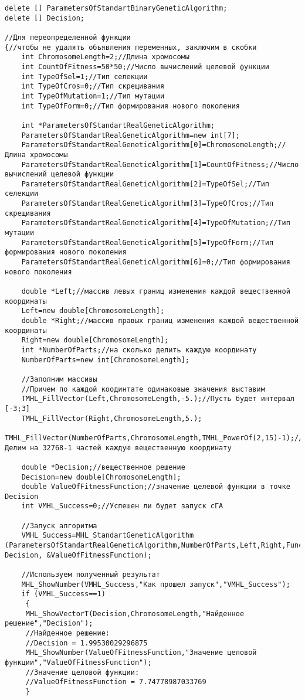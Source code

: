 \documentclass[a4paper,12pt]{article}
\begin{document}
\begin{lstlisting}[label=code_use_MHL_StandartGeneticAlgorithm,caption=Пример использования]
delete [] ParametersOfStandartBinaryGeneticAlgorithm;
delete [] Decision;

//Для переопределенной функции
{//чтобы не удалять объявления переменных, заключим в скобки
    int ChromosomeLength=2;//Длина хромосомы
    int CountOfFitness=50*50;//Число вычислений целевой функции
    int TypeOfSel=1;//Тип селекции
    int TypeOfCros=0;//Тип скрещивания
    int TypeOfMutation=1;//Тип мутации
    int TypeOfForm=0;//Тип формирования нового поколения

    int *ParametersOfStandartRealGeneticAlgorithm;
    ParametersOfStandartRealGeneticAlgorithm=new int[7];
    ParametersOfStandartRealGeneticAlgorithm[0]=ChromosomeLength;//Длина хромосомы
    ParametersOfStandartRealGeneticAlgorithm[1]=CountOfFitness;//Число вычислений целевой функции
    ParametersOfStandartRealGeneticAlgorithm[2]=TypeOfSel;//Тип селекции
    ParametersOfStandartRealGeneticAlgorithm[3]=TypeOfCros;//Тип скрещивания
    ParametersOfStandartRealGeneticAlgorithm[4]=TypeOfMutation;//Тип мутации
    ParametersOfStandartRealGeneticAlgorithm[5]=TypeOfForm;//Тип формирования нового поколения
    ParametersOfStandartRealGeneticAlgorithm[6]=0;//Тип формирования нового поколения

    double *Left;//массив левых границ изменения каждой вещественной координаты
    Left=new double[ChromosomeLength];
    double *Right;//массив правых границ изменения каждой вещественной координаты
    Right=new double[ChromosomeLength];
    int *NumberOfParts;//на сколько делить каждую координату
    NumberOfParts=new int[ChromosomeLength];

    //Заполним массивы
    //Причем по каждой коодинтате одинаковые значения выставим
    TMHL_FillVector(Left,ChromosomeLength,-5.);//Пусть будет интервал [-3;3]
    TMHL_FillVector(Right,ChromosomeLength,5.);
    TMHL_FillVector(NumberOfParts,ChromosomeLength,TMHL_PowerOf(2,15)-1);//Делим на 32768-1 частей каждую вещественную координату

    double *Decision;//вещественное решение
    Decision=new double[ChromosomeLength];
    double ValueOfFitnessFunction;//значение целевой функции в точке Decision
    int VMHL_Success=0;//Успешен ли будет запуск cГА

    //Запуск алгоритма
    VMHL_Success=MHL_StandartGeneticAlgorithm (ParametersOfStandartRealGeneticAlgorithm,NumberOfParts,Left,Right,Func2, Decision, &ValueOfFitnessFunction);

    //Используем полученный результат
    MHL_ShowNumber(VMHL_Success,"Как прошел запуск","VMHL_Success");
    if (VMHL_Success==1)
     {
     MHL_ShowVectorT(Decision,ChromosomeLength,"Найденное решение","Decision");
     //Найденное решение:
     //Decision = 1.99530029296875
     MHL_ShowNumber(ValueOfFitnessFunction,"Значение целовой функции","ValueOfFitnessFunction");
     //Значение целовой функции:
     //ValueOfFitnessFunction = 7.74778987033769
     }


\end{lstlisting}
\end{document}
